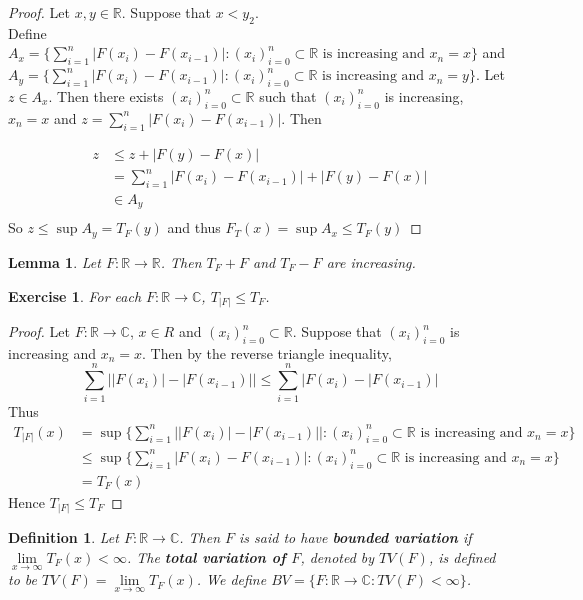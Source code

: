 \documentclass[12pt]{amsart}
\newtheorem{lem}[thm]{Lemma}
\newtheorem{defn}[thm]{Definition}
\newtheorem{ex}[thm]{Exercise}
\newcommand{\C}{\mathbb{C}}
\newcommand{\R}{\mathbb{R}}
\begin{document}
	\begin{proof}
		Let $x,y \in \R$. Suppose that $x<y_2$. \\Define  $A_x = \big \{\sum_{i=1}^{n}|F(x_{i}) - F(x_{i-1})|: (x_i)_{i=0}^n \subset \R \text{ is increasing and } x_n=x  \big \}$ and \\$A_y = \big \{\sum_{i=1}^{n}|F(x_{i}) - F(x_{i-1})|: (x_i)_{i=0}^n \subset \R \text{ is increasing and } x_n=y  \big \}$. Let $z \in A_x$. Then there exists $(x_i)_{i=0}^n \subset \R$ such that $(x_i)_{i=0}^n$ is increasing,\\ $x_n=x$ and $z = \sum_{i=1}^n |F(x_{i}) - F(x_{i-1})|$. Then
		
		\begin{align*}
			z 
			& \leq z+|F(y)-F(x)|\\
			&= \sum_{i=1}^n |F(x_{i}) - F(x_{i-1})| + |F(y)-F(x)|\\
			& \in A_y\\
		\end{align*} 
		So $z \leq \sup A_y = T_F(y) $ and thus $F_T(x)  = \sup A_x \leq T_F(y)$
	\end{proof}
	
	\begin{lem}
		Let $F:\R \rightarrow \R$. Then $T_F+F$ and $T_F-F$ are increasing.
	\end{lem}
	
	\begin{ex}
		For each $F:\R \rightarrow \C$, $T_{|F|} \leq T_F$.
	\end{ex}
	
	\begin{proof}
		Let $F:\R \rightarrow \C$, $x \in R$ and $(x_i)_{i=0}^n \subset \R$. Suppose that $(x_i)_{i=0}^n$ is increasing and $x_n=x$. Then by the reverse triangle inequality, $$ \sum_{i=1}^n\big||F(x_i)|-|F(x_{i-1})|\big|
		\leq \sum_{i=1}^n\big|F(x_i)-|F(x_{i-1})\big|$$
		Thus 
		\begin{align*}
			T_{|F|}(x) 
			&= \sup\bigg \{\sum_{i=1}^{n}\big||F(x_{i})| - |F(x_{i-1})|\big|: (x_i)_{i=0}^n \subset \R \text{ is increasing and } x_n=x  \bigg \} \\
			& \leq \sup\bigg \{\sum_{i=1}^{n}|F(x_{i}) - F(x_{i-1})|: (x_i)_{i=0}^n \subset \R \text{ is increasing and } x_n=x  \bigg \} \\
			&= T_F(x)
		\end{align*}
		Hence $T_{|F|} \leq T_F$
	\end{proof}
	
	\begin{defn}
		Let $F:\R \rightarrow \C$. Then $F$ is said to have \textbf{bounded variation} if $\lim \limits_{x \rightarrow \infty}T_F(x)<\infty$. The \textbf{total variation of $F$}, denoted by $TV(F)$, is defined to be $TV(F) = \lim\limits_{x\rightarrow \infty}T_F(x)$.
		We define $BV = \{F:\R \rightarrow \C: TV(F)<\infty \}$.
	\end{defn}
	
\end{document}
